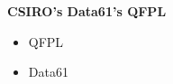 \begin{frame}
  \begin{block}\textbf{CSIRO's Data61's QFPL}
\end{block}
\begin{center}
\begin{itemize}
  \item QFPL
  \item Data61
\end{itemize}
\end{center}
\end{frame}
